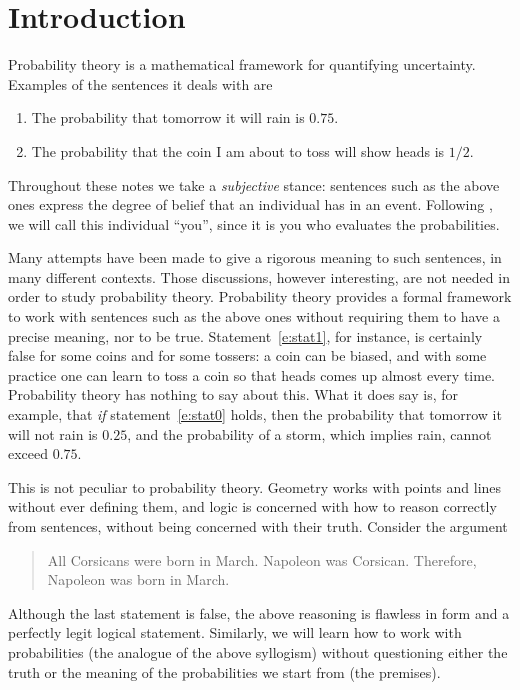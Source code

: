 	\section{Introduction}
	\label{s:intro}

Probability theory is a mathematical framework for quantifying uncertainty. Examples of the sentences it deals with are
\begin{enumerate}
	\item \label{e:stat0} The probability that tomorrow it will rain is $0.75$.
	\item \label{e:stat1} The probability that the coin I am about to toss will show heads is $1/2$.
\end{enumerate}
Throughout these notes we take a \emph{subjective} stance: sentences such as the above ones express the degree of belief that an individual has in an event. Following \cite{definetti}, we will call this individual ``you'', since it is you who evaluates the probabilities.

Many attempts have been made to give a rigorous meaning to such sentences, in many different contexts. %
Those discussions, however interesting, are not needed in order to study probability theory. Probability theory provides a formal framework to work with sentences such as the above ones without requiring them to have a precise meaning, nor to be true. Statement~\ref{e:stat1}, for instance, is certainly false for some coins and for some tossers: a coin can be biased, and with some practice one can learn to toss a coin so that heads comes up almost every time. Probability theory has nothing to say about this. What it does say is, for example, that \emph{if} statement~\ref{e:stat0} holds, then the probability that tomorrow it will not rain is $0.25$, and the probability of a storm, which implies rain, cannot exceed $0.75$.

This is not peculiar to probability theory. Geometry works with points and lines without ever defining them, and logic is concerned with how to reason correctly from sentences, without being concerned with their truth. Consider the argument
\begin{quote}
	All Corsicans were born in March. Napoleon was Corsican. Therefore, Napoleon was born in March.
\end{quote}
Although the last statement is false, the above reasoning is flawless in form and a perfectly legit logical statement. Similarly, we will learn how to work with probabilities (the analogue of the above syllogism) without questioning either the truth or the meaning of the probabilities we start from (the premises).

